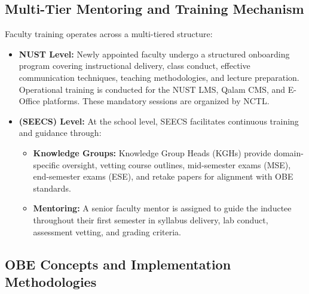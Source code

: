 \subsection{Multi-Tier Mentoring and Training Mechanism}
Faculty training operates across a multi-tiered structure:
\begin {itemize}
\item \textbf{NUST Level:} Newly appointed faculty undergo a structured onboarding program covering    instructional delivery, class conduct, effective communication techniques, teaching methodologies, and lecture preparation. Operational training is conducted for the NUST LMS, Qalam CMS, and E-Office platforms. These mandatory sessions are organized by NCTL.

\item \textbf{(SEECS) Level:} At the school level, SEECS facilitates continuous training and guidance through:

\begin{itemize}
    \item \textbf{Knowledge Groups:} Knowledge Group Heads (KGHs) provide domain-specific oversight, vetting course outlines, mid-semester exams (MSE), end-semester exams (ESE), and retake papers for alignment with OBE standards.
    \item \textbf{Mentoring:} A senior faculty mentor is assigned to guide the inductee throughout their first semester in syllabus delivery, lab conduct, assessment vetting, and grading criteria.  
\end {itemize}
    
\end{itemize}

\subsection{OBE Concepts and Implementation Methodologies}

